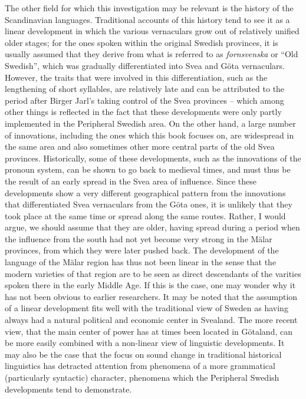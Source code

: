 The other field for which this investigation may be relevant is the history of the Scandinavian languages. Traditional accounts of this history tend to see it as a linear development in which the various vernaculars grow out of relatively unified older stages; for the ones spoken within the original Swedish provinces, it is usually assumed that they derive from what is referred to as \textit{fornsvenska} or “Old Swedish”, which was gradually differentiated into Svea and Göta vernaculars. However, the traits that were involved in this differentiation, such as the lengthening of short syllables, are relatively late and can be attributed to the period after Birger Jarl’s taking control of the Svea provinces – which among other things is reflected in the fact that these developments were only partly implemented in the Peripheral Swedish area. On the other hand, a large number of innovations, including the ones which this book focuses on, are widespread in the same area and also sometimes other more central parts of the old Svea provinces. Historically, some of these developments, such as the innovations of the pronoun system, can be shown to go back to medieval times, and must thus be the result of an early spread in the Svea area of influence. Since these developments show a very different geographical pattern from the innovations that differentiated Svea vernaculars from the Göta ones, it is unlikely that they took place at the same time or spread along the same routes. Rather, I would argue, we should assume that they are older, having spread during a period when the influence from the south had not yet become very strong in the Mälar provinces, from which they were later pushed back. The development of the language of the Mälar region has thus not been linear in the sense that the modern varieties of that region are to be seen as direct descendants of the varities spoken there in the early Middle Age. If this is the case, one may wonder why it has not been obvious to earlier researchers. It may be noted that the assumption of a linear development fits well with the traditional view of Sweden as having always had a natural political and economic center in Svealand. The more recent view, that the main center of power has at times been located in Götaland, can be more easily combined with a non-linear view of linguistic developments. It may also be the case that the focus on sound change in traditional historical linguistics has detracted attention from phenomena of a more grammatical (particularly syntactic) character, phenomena which the Peripheral Swedish developments tend to demonstrate.

